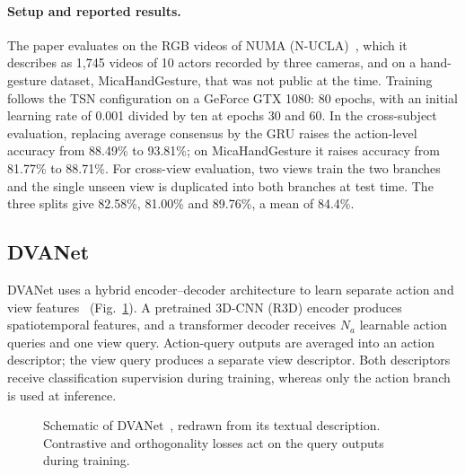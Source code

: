 \documentclass[runningheads]{llncs}
\begin{document}
\paragraph{Setup and reported results.} The paper evaluates on the RGB videos of NUMA (N-UCLA)~\cite{nucla}, which it describes as 1,745 videos of 10 actors recorded by three cameras, and on a hand-gesture dataset, MicaHandGesture, that was not public at the time. Training follows the TSN configuration on a GeForce GTX 1080: 80 epochs, with an initial learning rate of 0.001 divided by ten at epochs 30 and 60. In the cross-subject evaluation, replacing average consensus by the GRU raises the action-level accuracy from 88.49\% to 93.81\%; on MicaHandGesture it raises accuracy from 81.77\% to 88.71\%. For cross-view evaluation, two views train the two branches and the single unseen view is duplicated into both branches at test time. The three splits give 82.58\%, 81.00\% and 89.76\%, a mean of 84.4\%.

\subsection{DVANet}
DVANet uses a hybrid encoder--decoder architecture to learn separate action and view features~\cite{dva} (Fig.~\ref{fig:dvanet}). A pretrained 3D-CNN (R3D) encoder produces spatiotemporal features, and a transformer decoder receives $N_a$ learnable action queries and one view query. Action-query outputs are averaged into an action descriptor; the view query produces a separate view descriptor. Both descriptors receive classification supervision during training, whereas only the action branch is used at inference.

\begin{figure}[tb]
\centering
{}
\caption{Schematic of DVANet~\cite{dva}, redrawn from its textual description. Contrastive and orthogonality losses act on the query outputs during training.}
\label{fig:dvanet}
\end{figure}
\end{document}
